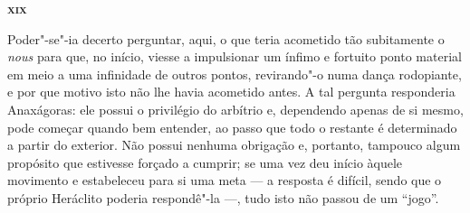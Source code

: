 \bigskip
\textsc{\textbf{xix}}
\bigskip

Poder"-se"-ia decerto perguntar, aqui, o que teria acometido tão subitamente
o \textit{nous} para que, no início, viesse a impulsionar um ínfimo e
fortuito ponto material em meio a uma infinidade de outros pontos,
revirando"-o numa dança rodopiante, e por que motivo isto não lhe havia
acometido antes. A tal pergunta responderia Anaxágoras: ele possui o
privilégio do arbítrio e, dependendo apenas de si mesmo, pode começar quando
bem entender, ao passo que todo o restante é determinado a partir do
exterior. Não possui nenhuma obrigação e, portanto,	\label{naopossuinenhuma} tampouco algum propósito que estivesse forçado a cumprir;
se uma vez deu início àquele movimento e estabeleceu para si uma meta --- a
resposta é difícil, sendo que o próprio Heráclito poderia respondê"-la ---,
tudo isto não passou de um ``jogo''.

